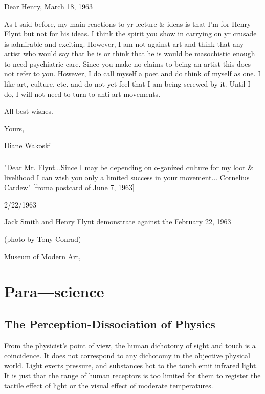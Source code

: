 \documentclass[10pt,twoside,draft]{memoir}
\begin{document}
{

\section{}

Dear Henry, March 18, 1963 


As I said before, my main reactions to yr lecture \& ideas is that I'm for 
Henry Flynt but not for his ideas. I think the spirit you show in carrying on 
yr crusade is admirable and exciting. However, I am not against art and think 
that any artist who would say that he is or think that he is would be 
masochistic enough to need psychiatric care. Since you make no claims to 
being an artist this does not refer to you. However, I do call myself a poet 
and do think of myself as one. I like art, culture, etc. and do not yet feel 
that I am being screwed by it. Until I do, I will not need to turn to anti-art 
movements. 

All best wishes. 

Yours, 

Diane Wakoski 

\section{}

"Dear Mr. Flynt...Since I may be depending on o-ganized culture for my 
loot \& livelihood I can wish you only a limited success in your movement... 
Cornelius Cardew" [froma postcard of June 7, 1963] 


\clearpage

{
2/22/1963 


Jack Smith and Henry Flynt demonstrate against the 
February 22, 1963 


(photo by Tony Conrad) 

Museum of Modern Art, 
}
\clearpage


\part{Para---science}


\chapter{The Perception-Dissociation of Physics}


From the physicist's point of view, the human dichotomy of sight and 
touch is a coincidence. It does not correspond to any dichotomy in the 
objective physical world. Light exerts pressure, and substances hot to the 
touch emit infrared light. It is just that the range of human receptors is too 
limited for them to register the tactile effect of light or the visual effect of 
moderate temperatures. 

}
\end{document}
